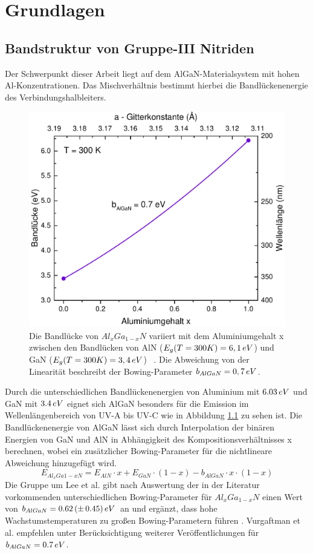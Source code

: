 \chapter{Grundlagen}
\thispagestyle{fancy}

\section{Bandstruktur von Gruppe-III Nitriden}
Der Schwerpunkt dieser Arbeit liegt auf dem AlGaN-Materialsystem mit hohen Al-Konzentrationen. Das Mischverhältnis bestimmt hierbei die Bandlückenenergie des Verbindungshalbleiters.
\begin{figure}[H]
    \centering
    \begin{minipage}[t]{\linewidth}
        \centering
        \includegraphics[width=0.5\linewidth]{Bilder/bandluecke.pdf}
        \caption{Die Bandlücke von $Al_{x}Ga_{1-x}N$ variiert mit dem Aluminiumgehalt x zwischen den Bandlücken von AlN ($E_{g}(T = 300 K) = 6,1 \thinspace eV$) und GaN ($E_{g}(T = 300 K) = 3,4 \thinspace  eV$) ~\cite{pipr}. Die Abweichung von der Linearität beschreibt der Bowing-Parameter $b_{AlGaN} = 0,7 \thinspace eV$.} 
        \label{fig:algan}
    \end{minipage}%
\end{figure}
\noindent
Durch die unterschiedlichen Bandlückenenergien von Aluminium mit $6.03 \thinspace eV$\cite{fenaln} und GaN mit $3.4 \thinspace eV$ \cite{pipr} eignet sich AlGaN besonders für die Emission im Wellenlängenbereich von UV-A bis UV-C wie in Abbildung \ref{fig:algan} zu sehen ist. 
\newline
\newline
Die Bandlückenenergie von AlGaN lässt sich durch Interpolation der binären Energien von GaN und AlN in Abhängigkeit des Kompositionsverhältnisses x berechnen, wobei ein zusätzlicher Bowing-Parameter für die nichtlineare Abweichung hinzugefügt wird. 
%
\begin{equation}
    E_{Al_{x}Ga{1-x}N} = E_{AlN} \cdot x + E_{GaN} \cdot (1-x) - b_{AlGaN} \cdot x \cdot (1-x) 
\end{equation}
%
Die Gruppe um Lee et al. gibt nach Auswertung der in der Literatur vorkommenden unterschiedlichen Bowing-Parameter für $Al_{x}Ga_{1-x}N$ einen Wert von $b_{AlGaN} = 0.62\thinspace(\pm \thinspace 0.45)\thinspace eV$ an und ergänzt, dass hohe Wachstumstemperaturen zu großen Bowing-Parametern führen \cite{doi:10.1063/1.123339}.
Vurgaftman et al. empfehlen unter Berücksichtigung weiterer Veröffentlichungen für $b_{AlGaN} =  0.7 \thinspace eV$.



